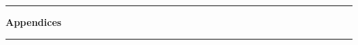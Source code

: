 \clearpage
\thispagestyle{plain}
    \begin{center}
        \vspace*{1cm}

        \vfill
            
        
        \textcolor{titleblue}{\rule{\linewidth}{1mm}}\par

        \vspace{0.5cm}

        \textbf{\Huge Appendices}
        
        \textcolor{titleblue}{\rule{\linewidth}{1mm}}\par

        \vfill
                        
        \vspace{0.8cm}
            
    \end{center}
\clearpage